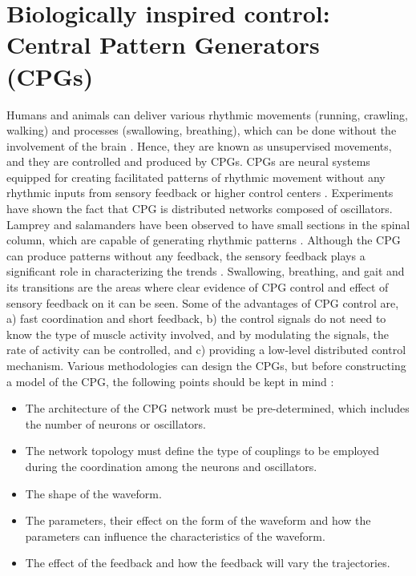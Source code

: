 

\section{Biologically inspired control: Central Pattern Generators (CPGs)}

Humans and animals can deliver various rhythmic movements (running, crawling, walking) and processes (swallowing, breathing), which can be done without the involvement of the brain \cite{ijspeert2008central}. Hence, they are known as unsupervised movements, and they are controlled and produced by \ac{CPG}s. \ac{CPG}s are neural systems equipped for creating facilitated patterns of rhythmic movement without any rhythmic inputs from sensory feedback or higher control centers \cite{ijspeert2008central,haghpanah2016generating,fang2016cpg}. Experiments have shown the fact that \ac{CPG} is distributed networks composed of oscillators. Lamprey and salamanders have been observed to have small sections in the spinal column, which are capable of generating rhythmic patterns \cite{delvovlve1999fictive}. Although the \ac{CPG} can produce patterns without any feedback, the sensory feedback plays a significant role in characterizing the trends \cite{mcclellan1993mechanosensory,sigvardt1996effects,kopell1998chains,Miller1987,lang2009brain}. Swallowing, breathing, and gait and its transitions are the areas where clear evidence of CPG control and effect of sensory feedback on it can be seen. Some of the advantages of \ac{CPG} control are, a) fast coordination and short feedback, b) the control signals do not need to know the type of muscle activity involved, and by modulating the signals, the rate of activity can be controlled, and c) providing a low-level distributed control mechanism.
Various methodologies can design the \ac{CPG}s, but before constructing a model of the \ac{CPG}, the following points should be kept in mind \cite{ijspeert2008central}:
\begin{itemize}
	\item The architecture of the \ac{CPG} network must be pre-determined, which includes the number of neurons or oscillators.
	\item The network topology must define the type of couplings to be employed during the coordination among the neurons and oscillators.
	\item The shape of the waveform.
	\item The parameters, their effect on the form of the waveform and how the parameters can influence the characteristics of the waveform.
	\item The effect of the feedback and how the feedback will vary the trajectories.
\end{itemize}

